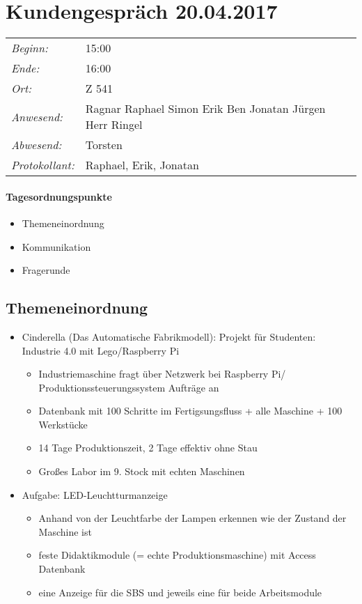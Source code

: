 \documentclass{scrartcl}
\date{20.04.2017}
\begin{document}
\maketitle
\section{Kundengespräch 20.04.2017}
\begin{tabular}[t]{p{.25\linewidth} p{.25\linewidth}}
\emph{Beginn:}				& 15:00\\
\emph{Ende:}					& 16:00\\
\emph{Ort:}						& Z 541\\
\emph{Anwesend:}	& 
Ragnar\newline
Raphael\newline
Simon\newline
Erik\newline
Ben\newline
Jonatan\newline
Jürgen\newline
Herr Ringel
\\
\emph{Abwesend:}		 & 
Torsten
\\
\emph{Protokollant:}& Raphael, Erik, Jonatan
\end{tabular}
\paragraph{Tagesordnungspunkte}
\begin{itemize}
\item Themeneinordnung
\item Kommunikation
\item Fragerunde
\end{itemize}
\subsection{Themeneinordnung}
\begin{itemize}
\item Cinderella (Das Automatische Fabrikmodell): Projekt für Studenten: Industrie 4.0 mit Lego/Raspberry Pi
\begin{itemize}
\item Industriemaschine fragt über Netzwerk bei Raspberry Pi/ Produktionssteuerungssystem Aufträge an
\item Datenbank mit 100 Schritte im Fertigsungsfluss + alle Maschine + 100 Werkstücke
\item 14 Tage Produktionszeit, 2 Tage effektiv ohne Stau
\item Großes Labor im 9. Stock mit echten Maschinen
\end{itemize}
\item Aufgabe: LED-Leuchtturmanzeige
\begin{itemize}
\item Anhand von der Leuchtfarbe der Lampen erkennen wie der Zustand der Maschine ist
\item feste Didaktikmodule (= echte Produktionsmaschine) mit Access Datenbank
\item eine Anzeige für die SBS und jeweils eine für beide Arbeitsmodule
\end{itemize}
\end{itemize}
\end{document}
